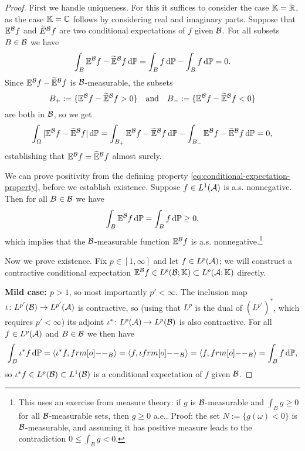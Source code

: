 \begin{proof}
  First we handle uniqueness.
  For this it suffices to consider the case $\mathbb{K} = \mathbb{R}$, as the case $\mathbb{K} = \mathbb{C}$ follows by considering real and imaginary parts.
  Suppose that $\mathbb{E}^{\mathcal{B}}f$ and $\widetilde{E}^{\mathcal{B}}f$ are two conditional expectations of $f$ given $\mathcal{B}$.
  For all subsets $B \in \mathcal{B}$ we have
  \begin{equation*}
    \int_B \mathbb{E}^{\mathcal{B}}f - \widetilde{\mathbb{E}}^{\mathcal{B}}f \, \mathrm{d}\mathbb{P} = \int_B f \, \mathrm{d}\mathbb{P} - \int_B f \, \mathrm{d}\mathbb{P} = 0.
  \end{equation*}
  Since $\mathbb{E}^{\mathcal{B}}f - \widetilde{\mathbb{E}}^{\mathcal{B}}f$ is $\mathcal{B}$-measurable, the subsets
  \begin{equation*}
    B_+ := \{ \mathbb{E}^{\mathcal{B}}f - \widetilde{\mathbb{E}}^{\mathcal{B}}f > 0\} \quad \text{and} \quad B_- := \{\mathbb{E}^{\mathcal{B}}f - \widetilde{\mathbb{E}}^{\mathcal{B}}f < 0\}
  \end{equation*}
  are both in $\mathcal{B}$, so we get
  \begin{equation*}
    \int_\Omega |\mathbb{E}^{\mathcal{B}}f - \widetilde{\mathbb{E}}^{\mathcal{B}}f | \, \mathrm{d}\mathbb{P}
    = \int_{B_+}  \mathbb{E}^{\mathcal{B}}f - \widetilde{\mathbb{E}}^{\mathcal{B}}f \, \mathrm{d}\mathbb{P}
    -  \int_{B_-}  \mathbb{E}^{\mathcal{B}}f - \widetilde{\mathbb{E}}^{\mathcal{B}}f \, \mathrm{d}\mathbb{P}
    = 0,
  \end{equation*}
  establishing that $\mathbb{E}^{\mathcal{B}}f = \widetilde{\mathbb{E}}^{\mathcal{B}}f$ almost surely.

  We can prove positivity from the defining property \eqref{eq:conditional-expectation-property}, before we establish existence.
  Suppose $f \in L^1(\mathcal{A})$ is a.s. nonnegative.
  Then for all $B \in \mathcal{B}$ we have
  \begin{equation*}
    \int_B \mathbb{E}^{\mathcal{B}} f \, \mathrm{d}\mathbb{P} = \int_B f \, \mathrm{d}\mathbb{P} \geq 0,
  \end{equation*}
  which implies that the $\mathcal{B}$-measurable function $\mathbb{E}^{\mathcal{B}}f$ is a.s. nonnegative.\footnote{This uses an exercise from measure theory: if $g$ is $\mathcal{B}$-measurable and $\int_B g \geq 0$ for all $\mathcal{B}$-measurable sets, then $g \geq 0$ a.e.. Proof: the set $N := \{g(\omega) < 0\}$ is $\mathcal{B}$-measurable, and assuming it has positive measure leads to the contradiction $0 \leq \int_B g < 0$.}


  Now we prove existence.
  Fix $p \in [1,\infty]$ and let $f \in L^p(\mathcal{A})$; we will construct a contractive conditional expectation $\mathbb{E}^{\mathcal{B}}f \in L^p(\mathcal{B};\mathbb{K}) \subset L^p(\mathcal{A};\mathbb{K})$ directly.

  \textbf{Mild case: $p > 1$}, so most importantly $p' < \infty$.
  The inclusion map $\iota \colon L^{p'}(\mathcal{B}) \rightarrow L^{p'}(\mathcal{A})$ is contractive, so (using that $L^p$ is the dual of $(L^{p'})^*$, which requires $p' < \infty$) its adjoint $\iota^* \colon L^p(\mathcal{A}) \rightarrow L^p(\mathcal{B})$ is also contractive.
  For all $f \in L^p(\mathcal{A})$ and $B \in \mathcal{B}$ we then have
  \begin{equation*}
    \int_B \iota^* f \, \dd\P = \langle \iota^* f, \1_{B} \rangle = \langle f, \iota \1_{B} \rangle = \langle f, \1_{B} \rangle = \int_B f \, \dd\P,
  \end{equation*}
  so $\iota^* f \in L^p(\mathcal{B}) \subset L^1(\mathcal{B})$ is a conditional expectation of $f$ given $\mathcal{B}$.


\end{proof}
